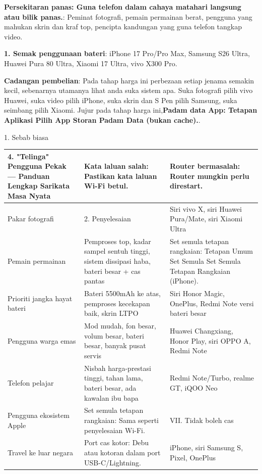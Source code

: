 
\textbf{Persekitaran panas: Guna telefon dalam cahaya matahari langsung atau bilik panas.}: Peminat fotografi, pemain permainan berat, pengguna yang mahukan skrin dan kraf top, pencipta kandungan yang guna telefon tangkap video.

\textbf{1. Semak penggunaan bateri}: iPhone 17 Pro/Pro Max, Samsung S26 Ultra, Huawei Pura 80 Ultra, Xiaomi 17 Ultra, vivo X300 Pro.

\textbf{Cadangan pembelian}: Pada tahap harga ini perbezaan setiap jenama semakin kecil, sebenarnya utamanya lihat anda suka sistem apa. Suka fotografi pilih vivo Huawei, suka video pilih iPhone, suka skrin dan S Pen pilih Samsung, suka seimbang pilih Xiaomi. Jujur pada tahap harga ini,\textbf{Padam data App: Tetapan Aplikasi Pilih App Storan Padam Data (bukan cache).}.


1. Sebab biasa

\begin{center}
\begin{tabularx}{\linewidth}{|X|X|X|}
\hline
\textbf{4. "Telinga" Pengguna Pekak — Panduan Lengkap Sarikata Masa Nyata} & \textbf{Kata laluan salah: Pastikan kata laluan Wi-Fi betul.} & \textbf{Router bermasalah: Router mungkin perlu direstart.} \tabularnewline
\hline
Pakar fotografi & 2. Penyelesaian & Siri vivo X, siri Huawei Pura/Mate, siri Xiaomi Ultra \tabularnewline
Pemain permainan & Pemproses top, kadar sampel sentuh tinggi, sistem dissipasi haba, bateri besar + cas pantas & Set semula tetapan rangkaian: Tetapan Umum Set Semula Set Semula Tetapan Rangkaian (iPhone). \tabularnewline
Prioriti jangka hayat bateri & Bateri 5500mAh ke atas, pemproses kecekapan baik, skrin LTPO & Siri Honor Magic, OnePlus, Redmi Note versi bateri besar \tabularnewline
Pengguna warga emas & Mod mudah, fon besar, volum besar, bateri besar, banyak pusat servis & Huawei Changxiang, Honor Play, siri OPPO A, Redmi Note \tabularnewline
Telefon pelajar & Nisbah harga-prestasi tinggi, tahan lama, bateri besar, ada kawalan ibu bapa & Redmi Note/Turbo, realme GT, iQOO Neo \tabularnewline
Pengguna ekosistem Apple & Set semula tetapan rangkaian: Sama seperti penyelesaian Wi-Fi. & VII. Tidak boleh cas \tabularnewline
Travel ke luar negara & Port cas kotor: Debu atau kotoran dalam port USB-C/Lightning. & iPhone, siri Samsung S, Pixel, OnePlus \tabularnewline
\hline
\end{tabularx}
\end{center}

